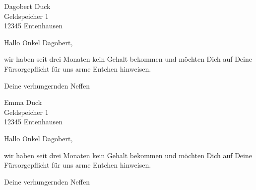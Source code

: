 \documentclass[12pt,ngerman]{scrlttr2}
\begin{document}
\begin{letter}{Dagobert Duck \\ Geldspeicher 1 \\ 12345 Entenhausen}



\opening{Hallo Onkel Dagobert,}

wir haben seit drei Monaten kein Gehalt bekommen und möchten Dich auf Deine Fürsorgepflicht für uns arme Entchen hinweisen.

\closing{Deine verhungernden Neffen}

\end{letter}
\begin{letter}{ Emma Duck \\ Geldspeicher 1 \\ 12345 Entenhausen}


\opening{Hallo Onkel Dagobert,}

wir haben seit drei Monaten kein Gehalt bekommen und möchten Dich auf Deine Fürsorgepflicht für uns arme Entchen hinweisen.

\closing{Deine verhungernden Neffen}

\end{letter}
\end{document}
